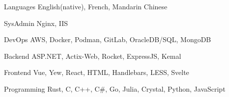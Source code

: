 
\begin{cvskills}
   \cvskill
   {Languages} %
   {English(native), French, Mandarin Chinese}

   \cvskill
   {SysAdmin} %
   {Nginx, IIS}

   \cvskill
   {DevOps} %
   {AWS, Docker, Podman, GitLab, OracleDB/SQL, MongoDB}

   \cvskill
   {Backend} %
   {ASP.NET, Actix-Web, Rocket, ExpressJS, Kemal}

   \cvskill
   {Frontend} %
   {Vue, Yew, React, HTML, Handlebars, LESS, Svelte}

   \cvskill
   {Programming} %
   {Rust, C, C++, C\#, Go, Julia, Crystal, Python, JavaScript}

\end{cvskills}
